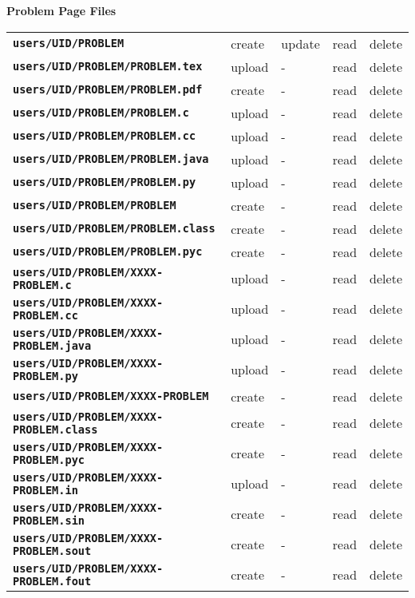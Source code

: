 \documentclass[12pt]{article}
\newcommand{\TT}[1]{{\tt \bfseries #1}}
\begin{document}
\begin{center}
{\bf Problem Page Files}
\\[1ex]
\begin{tabular}{lllll}
\TT{users/UID/PROBLEM}	                & create  & update & read & delete
\\[1ex]
\TT{users/UID/PROBLEM/PROBLEM.tex}	& upload  & -      & read & delete \\
\TT{users/UID/PROBLEM/PROBLEM.pdf}	& create  & -      & read & delete
\\[1ex]
\TT{users/UID/PROBLEM/PROBLEM.c}	& upload  & -      & read & delete \\
\TT{users/UID/PROBLEM/PROBLEM.cc}	& upload  & -      & read & delete \\
\TT{users/UID/PROBLEM/PROBLEM.java}	& upload  & -      & read & delete \\
\TT{users/UID/PROBLEM/PROBLEM.py}	& upload  & -      & read & delete \\
\TT{users/UID/PROBLEM/PROBLEM}		& create  & -      & read & delete \\
\TT{users/UID/PROBLEM/PROBLEM.class}	& create  & -      & read & delete \\
\TT{users/UID/PROBLEM/PROBLEM.pyc}	& create  & -      & read & delete
\\[1ex]
\TT{users/UID/PROBLEM/XXXX-PROBLEM.c}	& upload  & -      & read & delete \\
\TT{users/UID/PROBLEM/XXXX-PROBLEM.cc}	& upload  & -      & read & delete \\
\TT{users/UID/PROBLEM/XXXX-PROBLEM.java}& upload  & -      & read & delete \\
\TT{users/UID/PROBLEM/XXXX-PROBLEM.py}	& upload  & -      & read & delete \\
\TT{users/UID/PROBLEM/XXXX-PROBLEM}	& create  & -      & read & delete \\
\TT{users/UID/PROBLEM/XXXX-PROBLEM.class}
					& create  & -      & read & delete \\
\TT{users/UID/PROBLEM/XXXX-PROBLEM.pyc}	& create  & -      & read & delete
\\[1ex]
\TT{users/UID/PROBLEM/XXXX-PROBLEM.in}	& upload  & -      & read & delete \\
\TT{users/UID/PROBLEM/XXXX-PROBLEM.sin}	& create  & -      & read & delete \\
\TT{users/UID/PROBLEM/XXXX-PROBLEM.sout}& create  & -      & read & delete \\
\TT{users/UID/PROBLEM/XXXX-PROBLEM.fout}& create  & -      & read & delete \\

\end{tabular}
\end{center}
\end{document}
